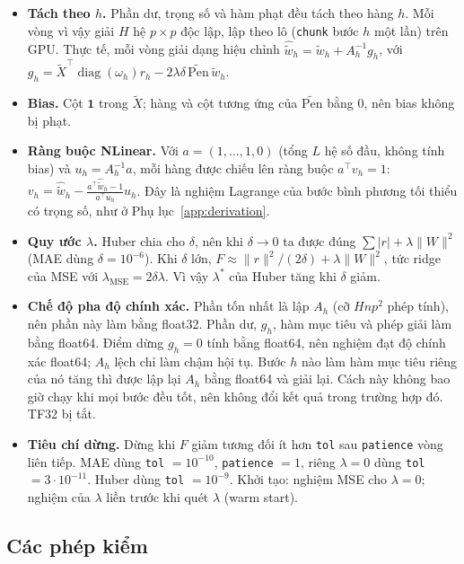 \begin{itemize}
    \item \textbf{Tách theo $h$.} Phần dư, trọng số và hàm phạt đều tách theo hàng $h$. Mỗi vòng vì vậy giải $H$ hệ $p \times p$ độc lập, lập theo lô (\texttt{chunk} bước $h$ một lần) trên GPU. Thực tế, mỗi vòng giải dạng hiệu chỉnh $\hat{\tilde w}_h = \tilde w_h + A_h^{-1} g_h$, với $g_h = \tilde X^\top \operatorname{diag}(\omega_h) r_h - 2\lambda\delta\, \widetilde{\mathrm{Pen}}\, \tilde w_h$.
    \item \textbf{Bias.} Cột $\mathbf 1$ trong $\tilde X$; hàng và cột tương ứng của $\widetilde{\mathrm{Pen}}$ bằng $0$, nên bias không bị phạt.
    \item \textbf{Ràng buộc NLinear.} Với $a = (1, \dots, 1, 0)$ (tổng $L$ hệ số đầu, không tính bias) và $u_h = A_h^{-1} a$, mỗi hàng được chiếu lên ràng buộc $a^\top v_h = 1$: $v_h = \hat{\tilde w}_h - \frac{a^\top \hat{\tilde w}_h - 1}{a^\top u_h} u_h$. Đây là nghiệm Lagrange của bước bình phương tối thiểu có trọng số, như ở Phụ lục~\ref{app:derivation}.
    \item \textbf{Quy ước $\lambda$.} Huber chia cho $\delta$, nên khi $\delta \to 0$ ta được đúng $\sum |r| + \lambda \|W\|^2$ (MAE dùng $\delta = 10^{-6}$). Khi $\delta$ lớn, $F \approx \|r\|^2/(2\delta) + \lambda\|W\|^2$, tức ridge của MSE với $\lambda_{\mathrm{MSE}} = 2\delta\lambda$. Vì vậy $\lambda^*$ của Huber tăng khi $\delta$ giảm.
    \item \textbf{Chế độ pha độ chính xác.} Phần tốn nhất là lập $A_h$ (cỡ $H n p^2$ phép tính), nên phần này làm bằng float32. Phần dư, $g_h$, hàm mục tiêu và phép giải làm bằng float64. Điểm dừng $g_h = 0$ tính bằng float64, nên nghiệm đạt độ chính xác float64; $A_h$ lệch chỉ làm chậm hội tụ. Bước $h$ nào làm hàm mục tiêu riêng của nó tăng thì được lập lại $A_h$ bằng float64 và giải lại. Cách này không bao giờ chạy khi mọi bước đều tốt, nên không đổi kết quả trong trường hợp đó. TF32 bị tắt.
    \item \textbf{Tiêu chí dừng.} Dừng khi $F$ giảm tương đối ít hơn \texttt{tol} sau \texttt{patience} vòng liên tiếp. MAE dùng \texttt{tol} $= 10^{-10}$, \texttt{patience} $= 1$, riêng $\lambda = 0$ dùng \texttt{tol} $= 3 \cdot 10^{-11}$. Huber dùng \texttt{tol} $= 10^{-9}$. Khởi tạo: nghiệm MSE cho $\lambda = 0$; nghiệm của $\lambda$ liền trước khi quét $\lambda$ (warm start).
\end{itemize}

\subsection{Các phép kiểm}

